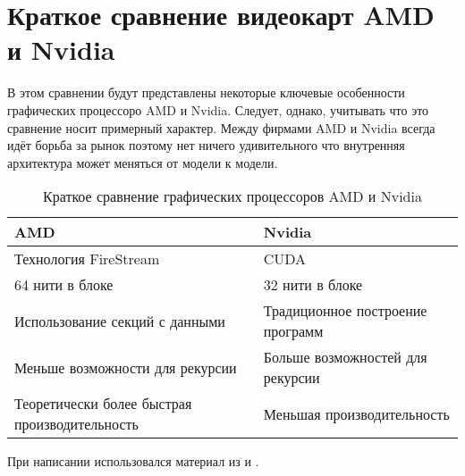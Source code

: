 \section{Краткое сравнение видеокарт AMD и Nvidia}

В этом сравнении будут представлены некоторые ключевые особенности графических процессоро AMD и Nvidia. Следует, однако, учитывать что это сравнение носит примерный характер. Между фирмами AMD и Nvidia всегда идёт борьба за рынок поэтому нет ничего удивительного что внутренняя архитектура может меняться от модели к модели.

\begin{table}
\begin{center}
\begin{tabular}{|p{5cm}|p{5cm}|}
\hline
AMD & Nvidia \\ \hline
Технология FireStream & CUDA \\ \hline
64 нити в блоке & 32 нити в блоке \\ \hline
Использование секций с данными & Традиционное построение программ \\ \hline
Меньше возможности для рекурсии & Больше возможностей для рекурсии \\ \hline
Теоретически более быстрая производительность & Меньшая производительность \\ 
\hline
\end{tabular}

\end{center}
\caption{Краткое сравнение графических процессоров AMD и Nvidia}
\end{table}

При написании использовался материал из \cite{nvidiacuda} и \cite{amd}.
